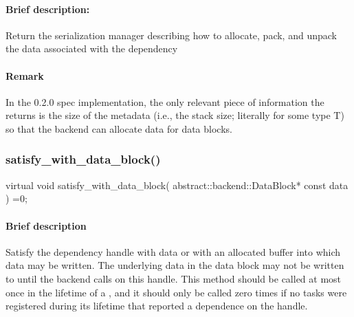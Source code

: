 \paragraph{Brief description:} Return the serialization manager describing how to allocate, pack, and unpack the data
       associated with the dependency
     
\paragraph{Remark} In the 0.2.0 spec implementation, the only relevant piece of information the 
       returns is the size of the metadata (i.e., the stack size; literally  for some type T) so that
       the backend can allocate data for data blocks.
     
\subsubsection{satisfy\_with\_data\_block()}
\begin{CppCode}
    virtual void
    satisfy_with_data_block(
      abstract::backend::DataBlock* const data
    ) =0;
\end{CppCode}

\paragraph{Brief description} Satisfy the dependency handle with data or with an allocated buffer into which data
       may be written.
       The underlying data in the data block may not be written to until the backend calls
        on this handle.  This method should be called at most
       once in the lifetime of a , and it should only be called zero times if
       no tasks were registered during its lifetime that reported a dependence on the handle.
     
